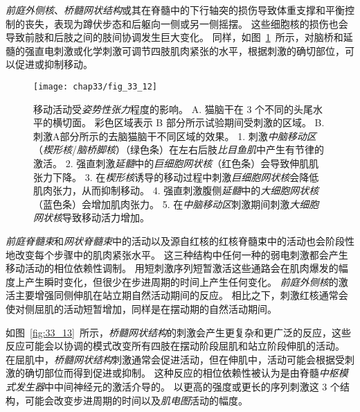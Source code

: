 \textit{前庭外侧核}、\textit{桥髓网状结构}或其在脊髓中的下行轴突的损伤导致体重支撑和平衡控制的丧失，表现为蹲伏步态和后躯向一侧或另一侧摇摆。
这些细胞核的损伤也会导致前肢和后肢之间的肢间协调发生巨大变化。
同样，如图~\ref{fig:33_12}~所示，对脑桥和延髓的强直电刺激或化学刺激可调节四肢肌肉紧张的水平，根据刺激的确切部位，可以促进或抑制移动。


\begin{figure}[htbp]
	\centering
	\texttt{[image: chap33/fig\_33\_12]}
	\caption{移动活动受\textit{姿势性张力}程度的影响。
		A. 猫脑干在 3 个不同的头尾水平的横切面。
		彩色区域表示 B 部分所示试验期间受刺激的区域。
		B. 刺激A部分所示的去脑猫脑干不同区域的效果。
		1. 刺激\textit{中脑移动区}（\textit{楔形核}/\textit{脑桥脚核}）（绿色条）在左右后肢\textit{比目鱼肌}中产生有节律的激活。
		2. 强直刺激\textit{延髓}中的\textit{巨细胞网状核}（红色条）会导致伸肌肌张力下降。
		3. 在\textit{楔形核}诱导的移动过程中刺激\textit{巨细胞网状核}会降低肌肉张力，从而抑制移动。
		4. 强直刺激腹侧\textit{延髓}中的\textit{大细胞网状核}（蓝色条）会增加肌肉张力。
		5. 在\textit{中脑移动区}刺激期间刺激\textit{大细胞网状核}导致移动活力增加。}
	\label{fig:33_12}
\end{figure}


\textit{前庭脊髓束}和\textit{网状脊髓束}中的活动以及源自红核的红核脊髓束中的活动也会阶段性地改变每个步骤中的肌肉紧张水平。
这三种结构中任何一种的弱电刺激都会产生移动活动的相位依赖性调制。
用短刺激序列短暂激活这些通路会在肌肉爆发的幅度上产生瞬时变化，但很少在步进周期的时间上产生任何变化。
\textit{前庭外侧核}的激活主要增强同侧伸肌在站立期自然活动期间的反应。
相比之下，刺激红核通常会使对侧屈肌的活动短暂增加，同样是在摆动期的自然活动期间。


如图~\ref{fig:33_13}~所示，\textit{桥髓网状结构}的刺激会产生更复杂和更广泛的反应，这些反应可能会以协调的模式改变所有四肢在摆动阶段屈肌和站立阶段伸肌的活动。
在屈肌中，\textit{桥髓网状结构}刺激通常会促进活动，但在伸肌中，活动可能会根据受刺激的确切部位而得到促进或抑制。
这种反应的相位依赖性被认为是由脊髓\textit{中枢模式发生器}中中间神经元的激活介导的。
以更高的强度或更长的序列刺激这 3 个结构，可能会改变步进周期的时间以及\textit{肌电图}活动的幅度。



